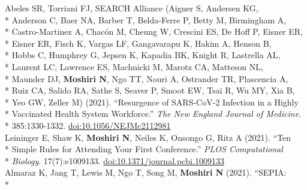 \documentclass[margin,line]{res}
\begin{document}
\begin{resume}
\hspace*{9mm} Abeles SR, Torriani FJ, SEARCH Alliance (Aigner S, Andersen KG,\\*
\hspace*{9mm} Anderson C, Baer NA, Barber T, Belda-Ferre P, Betty M, Birmingham A,\\*
\hspace*{9mm} Castro-Martinez A, Chac\'on M, Cheung W, Crescini ES, De Hoff P, Eisner ER,\\*
\hspace*{9mm} Eisner ER, Fisch K, Vargas LF, Gangavarapu K, Hakim A, Henson B,\\*
\hspace*{9mm} Hobbs C, Humphrey G, Jepsen K, Kapadia BK, Knight R, Lastrella AL,\\*
\hspace*{9mm} Laurent LC, Lawrence ES, Machnicki M, Marotz CA, Matteson NL,\\*
\hspace*{9mm} Maunder DJ, \textbf{Moshiri N}, Ngo TT, Nouri A, Ostrander TR, Plascencia A,\\*
\hspace*{9mm} Ruiz CA, Salido RA, Sathe S, Seaver P, Smoot EW, Tsai R, Wu MY, Xia B,\\*
\hspace*{9mm} Yeo GW, Zeller M) (2021). ``Resurgence of SARS-CoV-2 Infection in a Highly\\*
\hspace*{9mm} Vaccinated Health System Workforce.'' \textit{The New England Journal of Medicine}.\\*\vspace{2mm}
\hspace*{8mm} 385:1330-1332. \href{https://doi.org/10.1056/NEJMc2112981}{doi:10.1056/NEJMc2112981}\\
\hspace*{4mm} Leininger E, Shaw K, \textbf{Moshiri N}, Neiles K, Onsongo G, Ritz A (2021). ``Ten\\*
\hspace*{9mm} Simple Rules for Attending Your First Conference.'' \textit{PLOS Computational}\\*\vspace{2mm}
\hspace*{8mm} \textit{Biology}. 17(7):e1009133. \href{https://doi.org/10.1371/journal.pcbi.1009133}{doi:10.1371/journal.pcbi.1009133}\\
\hspace*{4mm} Almaraz K, Jang T, Lewis M, Ngo T, Song M, \textbf{Moshiri N} (2021). ``SEPIA:\\*

\end{resume}
\end{document}

